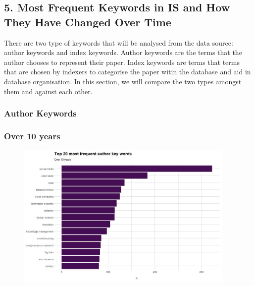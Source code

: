 \documentclass[
  letterpaper,
  DIV=11,
  numbers=noendperiod]{scrartcl}
\begin{document}
\newpage{}

\hypertarget{most-frequent-keywords-in-is-and-how-they-have-changed-over-time}{%
\subsection{\texorpdfstring{5. \textbf{Most Frequent Keywords in IS and
How They Have Changed Over
Time}}{5. Most Frequent Keywords in IS and How They Have Changed Over Time}}\label{most-frequent-keywords-in-is-and-how-they-have-changed-over-time}}

There are two type of keywords that will be analysed from the data
source: author keywords and index keywords. Author keywords are the
terms that the author chooses to represent their paper. Index keywords
are terms that terms that are chosen by indexers to categorise the paper
witin the database and aid in database organisation. In this section, we
will compare the two types amongst them and against each other.

\hypertarget{author-keywords}{%
\subsubsection{Author Keywords}\label{author-keywords}}

\hypertarget{over-10-years}{%
\subsubsection{Over 10 years}\label{over-10-years}}

\begin{figure}

{\centering \includegraphics[width=4.16667in,height=\textheight]{images/top20mostfreqauthorkeywords.jpg}

}

\end{figure}
\end{document}
